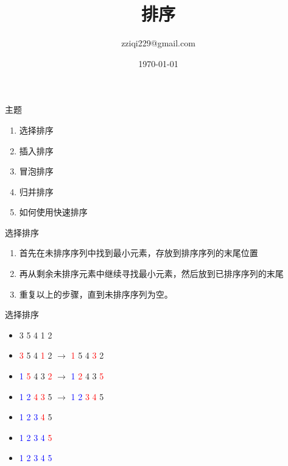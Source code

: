 \documentclass[aspectratio=169,xcolor=dvipsnames]{beamer}
\title[]{排序} %
\author[Ziqi Zhao] {zziqi229@gmail.com}
\institute[NTU] %
{
}
\date{\today} %
\begin{document}
\begin{frame}
    \titlepage
\end{frame}

\begin{frame}{主题}
    \begin{enumerate}
        \item 选择排序
        \item 插入排序
        \item 冒泡排序
        \item 归并排序
        \item 如何使用快速排序
    \end{enumerate}
\end{frame}

\begin{frame}{选择排序}
    \begin{enumerate}
        \item 首先在未排序序列中找到最小元素，存放到排序序列的末尾位置
        \item 再从剩余未排序元素中继续寻找最小元素，然后放到已排序序列的末尾
        \item 重复以上的步骤，直到未排序序列为空。
    \end{enumerate}
\end{frame}

\begin{frame}{选择排序}
    \begin{itemize}
        \item 3 5 4 1 2
        \item \textcolor{red}{3} 5 4  \textcolor{red}{1} 2 $\rightarrow$ \textcolor{red}{1} 5 4  \textcolor{red}{3} 2
        \item \textcolor{blue}{1} \textcolor{red}{5} 4 3 \textcolor{red}{2} $\rightarrow$ \textcolor{blue}{1} \textcolor{red}{2} 4 3 \textcolor{red}{5}
        \item \textcolor{blue}1 \textcolor{blue}2 \textcolor{red}4 \textcolor{red}3 5 $\rightarrow$ \textcolor{blue}1 \textcolor{blue}2 \textcolor{red}3 \textcolor{red}4 5
        \item \textcolor{blue}1 \textcolor{blue}2 \textcolor{blue}3 \textcolor{red}4 5
        \item \textcolor{blue}1 \textcolor{blue}2 \textcolor{blue}3 \textcolor{blue}4 \textcolor{red}5
        \item \textcolor{blue}1 \textcolor{blue}2 \textcolor{blue}3 \textcolor{blue}4 \textcolor{blue}5
    \end{itemize}

\end{frame}
\end{document}
